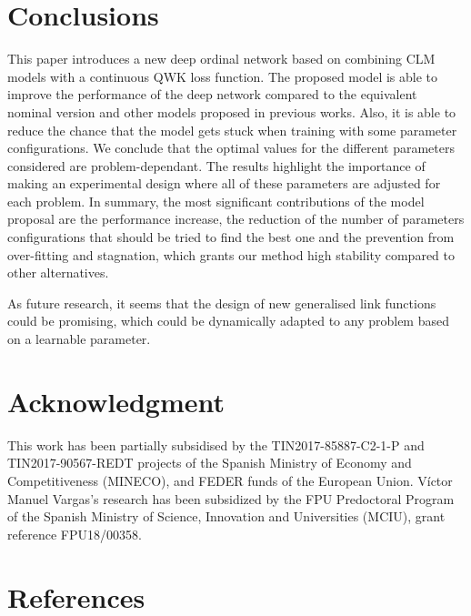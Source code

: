\documentclass[preprint]{elsarticle}
\begin{document}
\section{Conclusions}
\label{sect:conclusions} 
This paper introduces a new deep ordinal network based on combining CLM models with a continuous QWK loss function. The proposed model is able to improve the performance of the deep network compared to the equivalent nominal version and other models proposed in previous works. Also, it is able to reduce the chance that the model gets stuck when training with some parameter configurations. We conclude that the optimal values for the different parameters considered are problem-dependant. The results highlight the importance of making an experimental design where all of these parameters are adjusted for each problem. In summary, the most significant contributions of the model proposal are the performance increase, the reduction of the number of parameters configurations that should be tried to find the best one and the prevention from over-fitting and stagnation, which grants our method high stability compared to other alternatives.

As future research, it seems that the design of new generalised link functions could be promising, which could be dynamically adapted to any problem based on a learnable parameter. 

\section*{Acknowledgment}
This work has been partially subsidised by the TIN2017-85887-C2-1-P and TIN2017-90567-REDT projects of the Spanish Ministry of Economy and Competitiveness (MINECO), and FEDER funds of the European Union. Víctor Manuel Vargas's research has been subsidized by the FPU Predoctoral Program of the Spanish Ministry of Science, Innovation and Universities (MCIU), grant reference FPU18/00358.


\section*{References}


\end{document}
